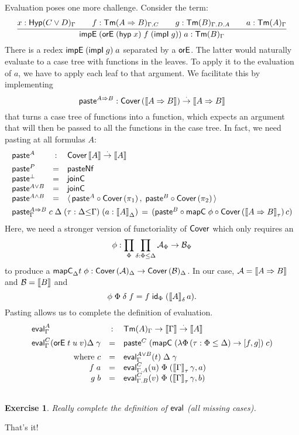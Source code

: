 \documentclass[a4paper]{article}
\newtheorem{exercise}[theorem]{Exercise}
\begin{document}
Evaluation poses one more challenge. Consider the term:
\[
\ru{x : \HypG {C \lor D} \qquad
    f : \Tm[\Gamma.C]{A \imp B} \qquad
    g : \Tm[\Gamma.D.A]{B} \qquad
    a : \TmG A
  }{\impEP{\orE {(\hyp x)} f {(\impI g)}} a : \TmG B}
\]
There is a redex $\impEP {\impI g} a$ separated by a $\torE$.  The latter
would naturally evaluate to a case tree with functions in the
leaves.  To apply it to the evaluation of $a$, we have to apply each
leaf to that argument.  We facilitate this by implementing
\[
  \tpaste^{A \imp B} : \Cover{\den{A \imp B}} \todot \den{A \imp B}
\]
that turns a case tree of functions into a function, which expects an
argument that will then be passed to all the functions in the case
tree.  In fact, we need pasting at all formulas $A$:
\[
\begin{array}{lcl}
\tpaste^A & : & \tCover\,{\den A} \todot \den A \\[1ex]
\tpaste^P & = & \tpasteNf \\
\tpaste^\bot & = & \tjoinC \\
\tpaste^{A \lor B} & = & \tjoinC \\
\tpaste^{A \land B} & = & \langle\,
  \tpaste^A \comp \Cover{\pi_1} \, , \;
  \tpaste^B \comp \Cover{\pi_2} \,\rangle \\[1ex]
\multicolumn 3 {l} {\paste[\Gamma]{A \imp B} c \;
  \Delta \; (\tau : \Delta{\leq}\Gamma) \; (a : \den A _\Delta) \, = \,
  (\tpaste^B \comp \mapC \phi \comp \Cover{\den {A \imp B}_\tau}\, c)
}
\end{array}
\]
Here, we need a stronger version of functoriality of $\tCover$ which
only requires an
\[
  \phi : \prod_{\Phi} \prod_{\delta : \Phi \leq \Delta} \A_\Phi
             \to \B_\Phi
\]
to produce a $\tmapC_\Delta t\; \phi : \Cover\A_\Delta \to \Cover\B_\Delta$.
In our case, $\A = \den{A \imp B}$ and $\B = \den{B}$ and
\[
  \phi\;\Phi\;\delta\;f = f\;\id[\Phi]\;(\den A _\delta\, a)
  .
\]
Pasting allows us to complete the definition of evaluation.
\[
\begin{array}{lcl}
  \teval_\Gamma^A & : & \TmG A \to \den \Gamma \todot \den A \\[1ex]
  \evalG C {\orE t u v} \Delta \; \gamma & = &
    \tpaste^C \;
     (\mapC {(\lambda \Phi\, (\tau  : \Phi \leq \Delta) \to [f,g])}\;c) \\[1ex]
  \multicolumn 1 r {\mbox{ where } c} & = &
      \evalG{A \lor B} t\;\Delta\;\gamma \\
  \multicolumn 1 r {f\;a} & = &
    \eval[\Gamma.A] C u \;\Phi\;(\den\Gamma_\tau\,\gamma, a) \\
  \multicolumn 1 r {g\;b} & = &
    \eval[\Gamma.B] C v \;\Phi\;(\den\Gamma_\tau\,\gamma, b) \\
  \\
\end{array}
\]
\begin{exercise}
  Really complete the definition of $\teval$ (all missing cases).
\end{exercise}
That's it!
\end{document}
